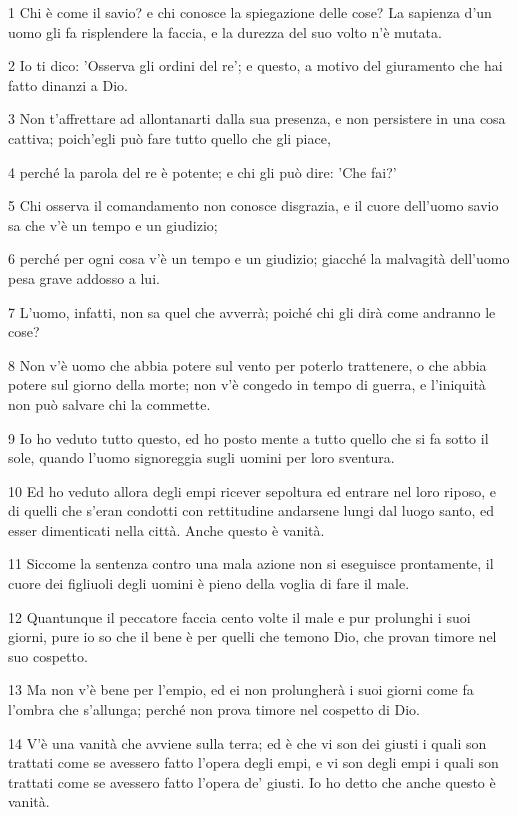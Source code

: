 \par 1 Chi è come il savio? e chi conosce la spiegazione delle cose? La sapienza d'un uomo gli fa risplendere la faccia, e la durezza del suo volto n'è mutata.
\par 2 Io ti dico: 'Osserva gli ordini del re'; e questo, a motivo del giuramento che hai fatto dinanzi a Dio.
\par 3 Non t'affrettare ad allontanarti dalla sua presenza, e non persistere in una cosa cattiva; poich'egli può fare tutto quello che gli piace,
\par 4 perché la parola del re è potente; e chi gli può dire: 'Che fai?'
\par 5 Chi osserva il comandamento non conosce disgrazia, e il cuore dell'uomo savio sa che v'è un tempo e un giudizio;
\par 6 perché per ogni cosa v'è un tempo e un giudizio; giacché la malvagità dell'uomo pesa grave addosso a lui.
\par 7 L'uomo, infatti, non sa quel che avverrà; poiché chi gli dirà come andranno le cose?
\par 8 Non v'è uomo che abbia potere sul vento per poterlo trattenere, o che abbia potere sul giorno della morte; non v'è congedo in tempo di guerra, e l'iniquità non può salvare chi la commette.
\par 9 Io ho veduto tutto questo, ed ho posto mente a tutto quello che si fa sotto il sole, quando l'uomo signoreggia sugli uomini per loro sventura.
\par 10 Ed ho veduto allora degli empi ricever sepoltura ed entrare nel loro riposo, e di quelli che s'eran condotti con rettitudine andarsene lungi dal luogo santo, ed esser dimenticati nella città. Anche questo è vanità.
\par 11 Siccome la sentenza contro una mala azione non si eseguisce prontamente, il cuore dei figliuoli degli uomini è pieno della voglia di fare il male.
\par 12 Quantunque il peccatore faccia cento volte il male e pur prolunghi i suoi giorni, pure io so che il bene è per quelli che temono Dio, che provan timore nel suo cospetto.
\par 13 Ma non v'è bene per l'empio, ed ei non prolungherà i suoi giorni come fa l'ombra che s'allunga; perché non prova timore nel cospetto di Dio.
\par 14 V'è una vanità che avviene sulla terra; ed è che vi son dei giusti i quali son trattati come se avessero fatto l'opera degli empi, e vi son degli empi i quali son trattati come se avessero fatto l'opera de' giusti. Io ho detto che anche questo è vanità.
